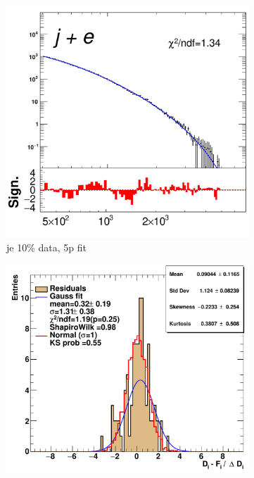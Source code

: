 \newpage

\begin{figure}[H]
    \centering
    \begin{subfigure}[h]{0.38\linewidth}
    \includegraphics[scale=0.3]{figs/app/10data/pub_mass_10per_extrapolate_je.pdf}%
    \caption{je 10\% data, 5p fit }
    \end{subfigure}
    \hfill
    \begin{subfigure}[h]{0.4\linewidth}
    \includegraphics[scale=0.32]{figs/app/10data/pub_mass_10per_extrapolate_residuals_je.pdf}%

\end{subfigure}
\end{figure}
